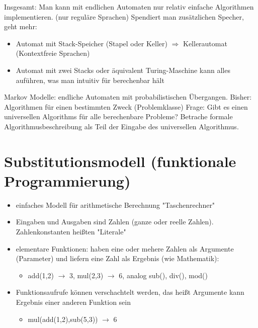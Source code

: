 \documentclass[a4paper]{scrartcl}
\begin{document}
Insgesamt: Man kann mit endlichen Automaten nur relativ einfache Algorithmen implementieren. (nur reguläre Sprachen)
Spendiert man zusätzlichen Specher, geht mehr:
\begin{itemize}
\item Automat mit Stack-Speicher (Stapel oder Keller) $\Rightarrow$ Kellerautomat (Kontextfreie Sprachen)
\item Automat mit zwei Stacks oder äquivalent Turing-Maschine kann alles auführen, was man intuitiv für berechenbar hält
\end{itemize}
Markov Modelle: endliche Automaten mit probabilistischen Übergangen.
Bisher: Algorithmen für einen bestimmten Zweck (Problemklasse)
Frage: Gibt es einen universellen Algorithms für alle berechenbare Probleme?
Betrache formale Algorithmusbeschreibung als Teil der Eingabe des universellen Algorithmus.
\section{Substitutionsmodell (funktionale Programmierung)}
\label{sec-5}
\begin{itemize}
\item einfaches Modell für arithmetische Berechnung "Taschenrechner"
\item Eingaben und Ausgaben sind Zahlen (ganze oder reelle Zahlen). Zahlenkonstanten heißten "Literale"
\item elementare Funktionen: haben eine oder mehere Zahlen als Argumente (Parameter) und liefern eine Zahl als Ergebnis (wie Mathematik):
\begin{itemize}
\item add(1,2) $\rightarrow$ 3, mul(2,3) $\rightarrow$ 6, analog sub(), div(), mod()
\end{itemize}
\item Funktionsaufrufe können verschachtelt werden, das heißt Argumente kann Ergebnis einer anderen Funktion sein
\begin{itemize}
\item mul(add(1,2),sub(5,3)) $\rightarrow$ 6
\end{itemize}
\end{itemize}
\end{document}
